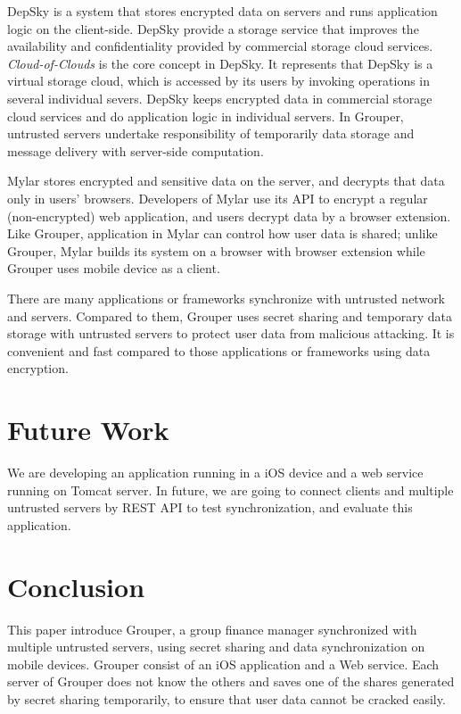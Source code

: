 \documentclass[twocolumn,10pt]{article}
\begin{document}
DepSky\cite{bessani2013depsky} is a system that stores encrypted data on servers and runs application logic on the client-side\cite{wang2016sieve}. DepSky provide a storage service that improves the availability and confidentiality provided by commercial storage cloud services. \emph{Cloud-of-Clouds} is the core concept in DepSky. It represents that DepSky is a virtual storage cloud, which is accessed by its users by invoking operations in several individual severs. DepSky keeps encrypted data in commercial storage cloud services and do application logic in individual servers. In Grouper,  untrusted servers undertake responsibility of temporarily data storage and message delivery with server-side computation.

Mylar\cite{popa2014building} stores encrypted and sensitive data on the server, and decrypts that data only in users’ browsers. Developers of Mylar use its API to encrypt a regular (non-encrypted) web application, and users decrypt data by a browser extension. Like Grouper, application in Mylar can control how user data is shared\cite{wang2016sieve}; unlike Grouper, Mylar builds its system on a browser with browser extension while Grouper uses mobile device as a client.

There are many applications or frameworks synchronize with untrusted network and servers. Compared to them, Grouper uses secret sharing and temporary data storage with untrusted servers to protect user data from malicious attacking. It is convenient and fast compared to those applications or frameworks using data encryption.

\section{Future Work}

We are developing an application running in a iOS device and a web service running on Tomcat server. In future, we are going to connect clients and multiple untrusted servers by REST API to test synchronization, and evaluate this application.

\section{Conclusion}

This paper introduce Grouper, a group finance manager synchronized with multiple untrusted servers, using secret sharing and data synchronization on mobile devices. Grouper consist of an iOS application and a Web service.  Each server of Grouper does not know the others and saves one of the shares generated by secret sharing temporarily, to ensure that user data cannot be cracked easily. 



\end{document}
